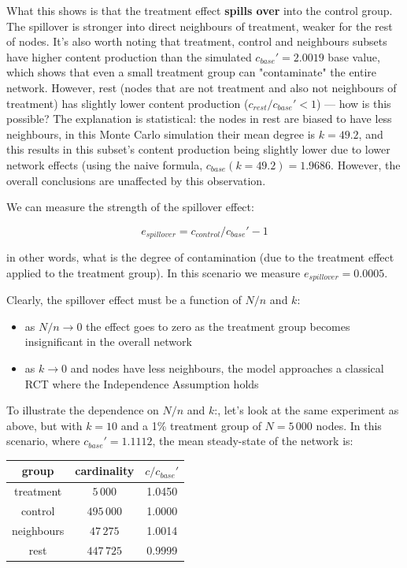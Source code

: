 \documentclass[final,5p,times,twocolumn,authoryear]{elsarticle}
\begin{document}
What this shows is that the treatment effect \textbf{spills over} into the control group. The spillover is stronger into direct neighbours of treatment, weaker for the rest of nodes. It's also worth noting that treatment, control and neighbours subsets have higher content production than the simulated $c_{base}\prime=2.0019$ base value, which shows that even a small treatment group can "contaminate" the entire network. However, rest (nodes that are not treatment and also not neighbours of treatment) has slightly lower content production ($c_{rest}/c_{base}\prime < 1$) --- how is this possible? The explanation is statistical: the nodes in rest are biased to have less neighbours, in this Monte Carlo simulation their mean degree is $k=49.2$, and this results in this subset's content production being slightly lower due to lower network effects (using the naive formula, $c_{base}(k=49.2)=1.9686$. However, the overall conclusions are unaffected by this observation.

We can measure the strength of the spillover effect:

\begin{equation}
e_{spillover} = c_{control} / c_{base}\prime  - 1
\end{equation}

in other words, what is the degree of contamination (due to the treatment effect applied to the treatment group). In this scenario we measure $e_{spillover} = 0.0005$.

Clearly, the spillover effect must be a function of $N/n$ and $k$:

\begin{itemize}
\setlength\itemsep{0em}
    \item as $N/n \rightarrow 0$ the effect goes to zero as the treatment group becomes insignificant in the overall network
    \item as $k \rightarrow 0$ and nodes have less neighbours, the model approaches a classical RCT where the Independence Assumption holds
\end{itemize}

To illustrate the dependence on $N/n$ and $k$:, let's look at the same experiment as above, but with $k=10$ and a 1\% treatment group of $N=5\,000$ nodes. In this scenario, where $c_{base}\prime=1.1112$, the mean steady-state of the network is:

\begin{center}
\begin{tabular}{ |c|c|c| } 
 \hline
 \textbf{group} & \textbf{cardinality} & $c / c_{base}\prime$ \\ 
 \hline
 treatment   &  $5\,000$    &  1.0450 \\ 
 control     &  $495\,000$  &  1.0000 \\ 
 neighbours  &  $47\,275$   &  1.0014 \\ 
 rest        &  $447\,725$  &  0.9999 \\ 
 \hline
\end{tabular}
\end{center}
\end{document}
